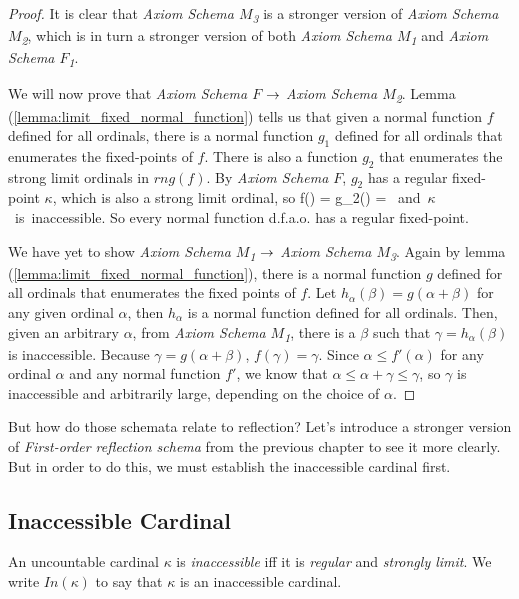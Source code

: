 \begin{proof} %
It is clear that \emph{Axiom Schema $M$\textsubscript{3}} is a stronger version of \emph{Axiom Schema $M$\textsubscript{2}}, which is in turn a stronger version of both \emph{Axiom Schema $M$\textsubscript{1}} and \emph{Axiom Schema $F$\textsubscript{1}}. 

We will now prove that \emph{Axiom Schema $F$} $\rightarrow$ \emph{Axiom Schema $M$\textsubscript{2}}. 
Lemma (\ref{lemma:limit_fixed_normal_function}) tells us that given a normal function $f$ defined for all ordinals, 
there is a normal function $g_1$ defined for all ordinals that enumerates the fixed-points of $f$. 
There is also a function $g_2$ that enumerates the strong limit ordinals in $rng(f)$. By \emph{Axiom Schema $F$}, $g_2$ has a regular fixed-point $\kappa$, which is also a strong limit ordinal, so 
\beq
f(\kappa) = g_2(\kappa) = \kappa \mbox{ and $\kappa$ is inaccessible.} 
\eeq
So every normal function d.f.a.o. has a regular fixed-point.

We have yet to show \emph{Axiom Schema $M$\textsubscript{1}} $\rightarrow$ \emph{Axiom Schema $M$\textsubscript{3}}. Again by lemma (\ref{lemma:limit_fixed_normal_function}), there is a normal function $g$ defined for all ordinals that enumerates the fixed points of $f$. Let $h_\alpha(\beta) = g(\alpha+\beta)$ for any given ordinal $\alpha$, then $h_\alpha$ is a normal function defined for all ordinals.
Then, given an arbitrary $\alpha$, from \emph{Axiom Schema $M$\textsubscript{1}}, there is a $\beta$ such that $\gamma = h_\alpha(\beta)$ is inaccessible. 
Because $\gamma = g(\alpha+\beta)$, $f(\gamma) = \gamma$. 
Since $\alpha \leq f'(\alpha)$ for any ordinal $\alpha$ and any normal function $f'$, we know that $\alpha \leq \alpha + \gamma \leq \gamma$, so $\gamma$ is inaccessible and arbitrarily large, depending on the choice of $\alpha$.
\end{proof}

But how do those schemata relate to reflection? 
Let's introduce a stronger version of \emph{First-order reflection schema} from the previous chapter to see it more clearly. %
But in order to do this, we must establish the inaccessible cardinal first.

\subsection{Inaccessible Cardinal}\label{sec:inaccessible}
\begin{definition}
An uncountable cardinal $\kappa$ is \emph{inaccessible} iff it is \emph{regular} and \emph{strongly limit}. We write $In(\kappa)$ to say that $\kappa$ is an inaccessible cardinal.
\end{definition}

